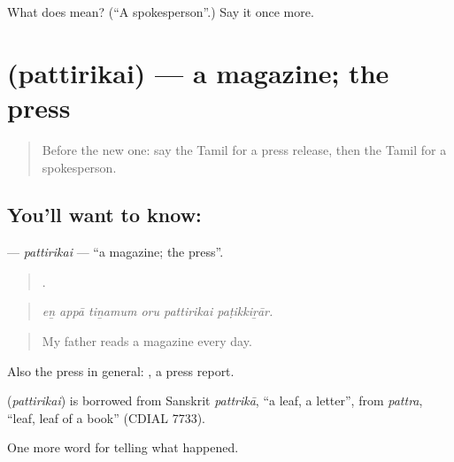 \begin{tcolorbox}[breakable,colback=teal!4,colframe=teal!35!black,title={Before you move on}]
What does   mean? (\textquotedblleft{}A spokesperson\textquotedblright{}.) Say it once more.
\end{tcolorbox}
\section[\texorpdfstring{\ta{பத்திரிகை} (pattirikai)}{பத்திரிகை (pattirikai)}]{ (pattirikai) — a magazine; the press}

\label{lesson:TA-C307-pattirikai}



\begin{quote}
Before the new one: say the Tamil for a press release, then the Tamil for a spokesperson.
\end{quote}

\subsection*{You'll want to know: }
\textbf{} — \emph{pattirikai} — \textquotedblleft{}a magazine; the press\textquotedblright{}.

\begin{quote}
     .
\end{quote}

\begin{quote}
\emph{eṉ appā tiṉamum oru pattirikai paṭikkiṟār.}
\end{quote}

\begin{quote}
My father reads a magazine every day.
\end{quote}

Also the press in general:  , a press report.

\begin{cousinweb}
\textbf{} (\emph{pattirikai}) is borrowed from Sanskrit \emph{pattrikā}, \textquotedblleft{}a leaf, a letter\textquotedblright{}, from \emph{pattra}, \textquotedblleft{}leaf, leaf of a book\textquotedblright{} (CDIAL 7733).
\end{cousinweb}

\begin{grammarlens}[title={What you've built}]
One more word for telling what happened.
\end{grammarlens}

